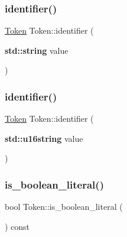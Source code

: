 \subsubsection{\texorpdfstring{identifier()}{identifier()}\hspace{0.1cm}{\footnotesize\ttfamily [1/2]}}
{\footnotesize\ttfamily \hyperlink{class_token}{Token} Token\+::identifier (\begin{DoxyParamCaption}\item[{\textbf{ std\+::string}}]{value }\end{DoxyParamCaption})\hspace{0.3cm}{\ttfamily [static]}}

\mbox{\label{class_token_a6233a8babfc11fbf5ad709d812c23bfd}} 
\subsubsection{\texorpdfstring{identifier()}{identifier()}\hspace{0.1cm}{\footnotesize\ttfamily [2/2]}}
{\footnotesize\ttfamily \hyperlink{class_token}{Token} Token\+::identifier (\begin{DoxyParamCaption}\item[{\textbf{ std\+::u16string}}]{value }\end{DoxyParamCaption})\hspace{0.3cm}{\ttfamily [static]}}

\mbox{\label{class_token_a4a628c34f5ac213787a74b19a5d862d9}} 
\subsubsection{\texorpdfstring{is\+\_\+boolean\+\_\+literal()}{is\_boolean\_literal()}}
{\footnotesize\ttfamily bool Token\+::is\+\_\+boolean\+\_\+literal (\begin{DoxyParamCaption}{ }\end{DoxyParamCaption}) const}

\mbox{\label{class_token_aaebab1fc38280c1e7714254916495103}} 
